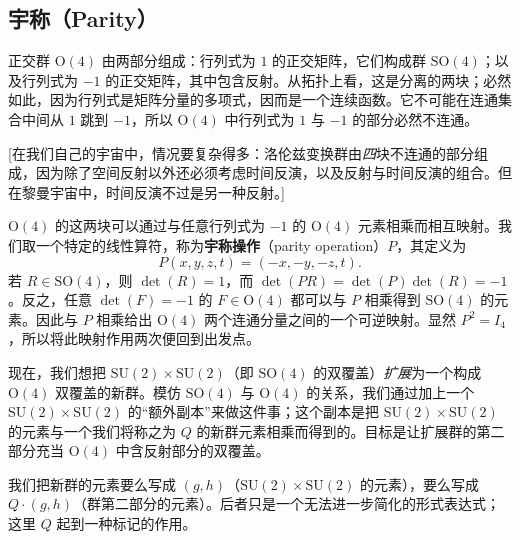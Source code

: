 \subsection{宇称（Parity）}

正交群 $\mathrm{O}(4)$ 由两部分组成：行列式为 $1$ 的正交矩阵，它们构成群 $\mathrm{SO}(4)$；以及行列式为 $-1$ 的正交矩阵，其中包含反射。从拓扑上看，这是分离的两块；必然如此，因为行列式是矩阵分量的多项式，因而是一个连续函数。它不可能在连通集合中间从 $1$ 跳到 $-1$，所以 $\mathrm{O}(4)$ 中行列式为 $1$ 与 $-1$ 的部分必然不连通。

[在我们自己的宇宙中，情况要复杂得多：洛伦兹变换群由\emph{四}块不连通的部分组成，因为除了空间反射以外还必须考虑时间反演，以及反射与时间反演的组合。但在黎曼宇宙中，时间反演不过是另一种反射。]

$\mathrm{O}(4)$ 的这两块可以通过与任意行列式为 $-1$ 的 $\mathrm{O}(4)$ 元素相乘而相互映射。我们取一个特定的线性算符，称为\textbf{宇称操作}（parity operation）$P$，其定义为
\begin{equation}
P(x,y,z,t)=(-x,-y,-z,t). \tag{4.2.2}
\end{equation}
若 $R\in\mathrm{SO}(4)$，则 $\det(R)=1$，而 $\det(PR)=\det(P)\det(R)=-1$。反之，任意 $\det(F)=-1$ 的 $F\in\mathrm{O}(4)$ 都可以与 $P$ 相乘得到 $\mathrm{SO}(4)$ 的元素。因此与 $P$ 相乘给出 $\mathrm{O}(4)$ 两个连通分量之间的一个可逆映射。显然 $P^2=I_4$，所以将此映射作用两次便回到出发点。

现在，我们想把 $\mathrm{SU}(2)\times\mathrm{SU}(2)$（即 $\mathrm{SO}(4)$ 的双覆盖）\emph{扩展}为一个构成 $\mathrm{O}(4)$ 双覆盖的新群。模仿 $\mathrm{SO}(4)$ 与 $\mathrm{O}(4)$ 的关系，我们通过加上一个 $\mathrm{SU}(2)\times\mathrm{SU}(2)$ 的“额外副本”来做这件事；这个副本是把 $\mathrm{SU}(2)\times\mathrm{SU}(2)$ 的元素与一个我们将称之为 $Q$ 的新群元素相乘而得到的。目标是让扩展群的第二部分充当 $\mathrm{O}(4)$ 中含反射部分的双覆盖。

我们把新群的元素要么写成 $(g,h)$（$\mathrm{SU}(2)\times\mathrm{SU}(2)$ 的元素），要么写成 $Q\cdot(g,h)$（群第二部分的元素）。后者只是一个无法进一步简化的形式表达式；这里 $Q$ 起到一种标记的作用。

